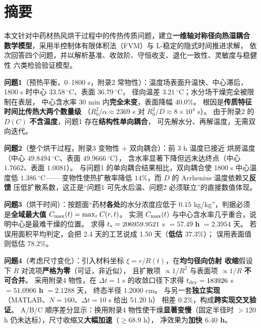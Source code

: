 
\section*{摘\quad 要}

本文针对中药材热风烘干过程中的传热传质问题，建立\textbf{一维轴对称径向热湿耦合
数学模型}，采用半控制体有限体积法（FVM）与 L-稳定的隐式时间推进求解，
依次回答四个问题，并以解析基准、收敛阶、守恒收支、退化一致性、灵敏度与稳健性
六类检验验证模型。

\textbf{问题1}（预热平衡，0--1800 s，附录2 常物性）：温度场表面升温快、中心滞后，
1800 s 时中心 $33.58\ ^\circ\mathrm{C}$、表面 $36.79\ ^\circ\mathrm{C}$，
径向温差 $3.21\ ^\circ\mathrm{C}$；水分场干燥完全被限制在表层，
中心含水率 30 min 内\textbf{完全未变}，表面降幅 $40.0\%$。
根因是\textbf{传质特征时间比传热大两个数量级}
（$R_0^2/\alpha\approx2369$ s 对 $R_0^2/D\approx8\times10^4$ s）。
由于附录2 的 $D(C)$ \textbf{不含温度}，问题1 存在\textbf{结构性单向耦合}，
可先解水分、再解温度，无需双向迭代。

\textbf{问题2}（整个烘干过程，附录3 变物性 $+$ 双向耦合）：前 3 h 温度已接近
烘房温度（中心 $49.8494\ ^\circ\mathrm{C}$、表面 $49.9666\ ^\circ\mathrm{C}$），
含水率显著下降但远未达终点（中心 $1.7662$、表面 $1.0081$）。
与问题1 的单向耦合结果相比，双向耦合使 1800 s 中心温度低 $1.386\ ^\circ\mathrm{C}$——
变物性使热扩散率降低 $14\%$，而 $D$ 的 Arrhenius 温度依赖又\textbf{反馈}
压低扩散系数，这正是``问题1 可先水后温、问题2 必须联立''的直接数值体现。

\textbf{问题3}（烘干时间）：按题面``药材\textbf{各处}的水分浓度应低于
$0.15$ kg/kg''，判据必须是\textbf{全域最大值} $C_{\max}(t)=\max_r C(r,t)$。
实测 $C_{\max}(t)$ 与中心含水率几乎重合，说明中心是最难干燥的位置。
求得 $t_{*} = 206959.9521$ s $= \mathbf{57.49}$ \textbf{h} $= 2.3954$ 天。
若误用面积平均判定，会把 2.4 天的工艺说成 1.50 天（\textbf{低估 $37.3\%$}）；
误用表面值则低估 $78.2\%$。

\textbf{问题4}（考虑尺寸变化）：引入材料坐标 $\xi=r/R(t)$，在\textbf{均匀径向仿射
收缩}假设下 $\dot R$ 对流项\textbf{严格为零}（可证，非近似），
且扩散项 $\propto1/R^{2}$ 与表面项 $\propto1/R$ \textbf{不可合并}。
采用附录4 物性，在 $\Delta t=1$ s 的收敛口径下求得
$t_{\mathrm{dry}} = 183926$ s $= \mathbf{51.0906}$ \textbf{h} $= 2.1288$ 天，
终态半径 $1.2000$ cm。
与另一套\textbf{独立实现}（MATLAB、$N=160$、$\Delta t=10$ s 给出 $51.20$ h）
相差 $0.2\%$，构成\textbf{跨实现交叉验证}。
A/B/C 顺序差分显示：换用附录4 物性使干燥\textbf{显著变慢}（固定半径时 $>120$ h
仍未达标），尺寸收缩又\textbf{大幅加速}（$\ge68.9$ h），
净效果为\textbf{加快 $6.40$ h}。

